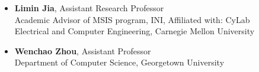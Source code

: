\documentclass[10pt]{res} %
\begin{document}
\begin{resume}
\begin{itemize}
\item {\bf Limin Jia},
Assistant Research Professor \\
Academic Advisor of MSIS program, INI,
Affiliated with: CyLab \\
Electrical and Computer Engineering, Carnegie Mellon University

\item {\bf Wenchao Zhou},
Assistant Professor \\
Department of Computer Science, 
Georgetown University


\end{itemize}









\end{resume}
\end{document}
